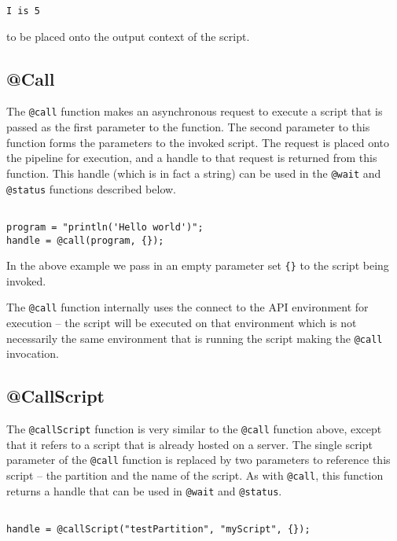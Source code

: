 \begin{Verbatim}
I is 5
\end{Verbatim}

to be placed onto the output context of the script.

\subsection{@Call}

The \verb+@call+ function makes an asynchronous request to execute a script that is passed as the first parameter to the function. The second parameter to this function forms the parameters to the invoked script. The request is placed onto the \Rapture pipeline for execution, and a handle to that request is returned from this function. This handle (which is in fact a string) can be used in the \verb+@wait+ and \verb+@status+ functions described below.

\begin{lstlisting}[caption={Example @Call}]

program = "println('Hello world')";
handle = @call(program, {});

\end{lstlisting}

In the above example we pass in an empty parameter set \verb+{}+ to the script being invoked.

The \verb+@call+ function internally uses the connect to the \Rapture API environment for execution -- the script will be executed on that environment which is not necessarily the same environment that is running the script making the \verb+@call+ invocation.

\subsection{@CallScript}
The \verb+@callScript+ function is very similar to the \verb+@call+ function above, except that it refers to a script that is already hosted on a \Rapture server. The single script parameter of the \verb+@call+ function is replaced by two parameters to reference this script -- the partition and the name of the script. As with \verb+@call+, this function returns a handle that can be used in \verb+@wait+ and \verb+@status+.

\begin{lstlisting}[caption={Example @CallScript}]

handle = @callScript("testPartition", "myScript", {});

\end{lstlisting}

